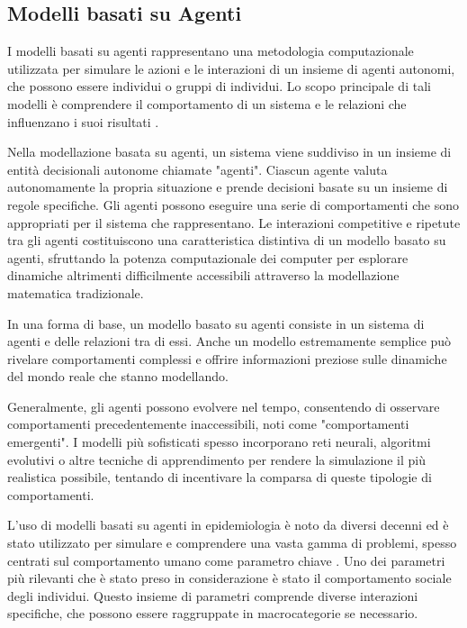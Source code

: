 \subsection{Modelli basati su Agenti}

I modelli basati su agenti rappresentano una metodologia computazionale 
utilizzata per simulare le azioni e le interazioni di un insieme di agenti 
autonomi, che possono essere individui o gruppi di individui. 
Lo scopo principale di tali modelli è comprendere il comportamento di un 
sistema e le relazioni che influenzano i suoi risultati \cite{7822080}.

Nella modellazione basata su agenti, un sistema viene suddiviso in un 
insieme di entità decisionali autonome chiamate "agenti". Ciascun agente 
valuta autonomamente la propria situazione e prende decisioni basate su 
un insieme di regole specifiche. Gli agenti possono eseguire una serie 
di comportamenti che sono appropriati per il sistema che rappresentano. 
Le interazioni competitive e ripetute tra gli agenti costituiscono una 
caratteristica distintiva di un modello basato su agenti, sfruttando la 
potenza computazionale dei computer per esplorare dinamiche altrimenti 
difficilmente accessibili attraverso la modellazione matematica tradizionale.

In una forma di base, un modello basato su agenti consiste in un sistema 
di agenti e delle relazioni tra di essi. Anche un modello estremamente 
semplice può rivelare comportamenti complessi e offrire informazioni 
preziose sulle dinamiche del mondo reale che stanno modellando.

Generalmente, gli agenti possono evolvere nel tempo, consentendo di 
osservare comportamenti precedentemente inaccessibili, noti come 
"comportamenti emergenti". I modelli più sofisticati spesso incorporano 
reti neurali, algoritmi evolutivi o altre tecniche di apprendimento per 
rendere la simulazione il più realistica possibile, tentando di 
incentivare la comparsa di queste tipologie di comportamenti.

L'uso di modelli basati su agenti in epidemiologia è noto da diversi 
decenni ed è stato utilizzato per simulare e comprendere una vasta gamma 
di problemi, spesso centrati sul comportamento umano come parametro chiave 
\cite{Bissett2021} \cite{El-Sayed2012-ac} \cite{Groff2019} \cite{Tracy2018-lc}. 
Uno dei parametri più rilevanti che è stato preso in considerazione è 
stato il comportamento sociale degli individui. Questo insieme di 
parametri comprende diverse interazioni specifiche, che possono essere 
raggruppate in macrocategorie se necessario.

